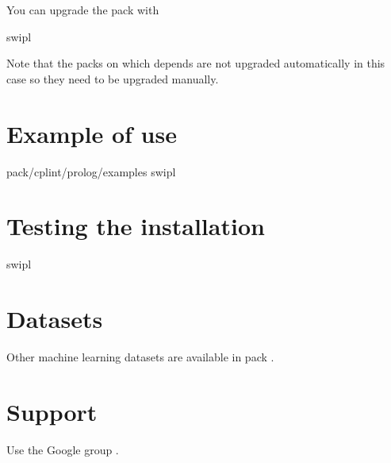 \documentclass[letterpaper,10pt,english]{sphinxmanual}
\begin{document}
\sphinxAtStartPar
You can upgrade the pack with

\begin{sphinxVerbatim}[commandchars=\\\{\}]
swipl
\end{sphinxVerbatim}

\sphinxAtStartPar
Note that the packs on which  depends are not upgraded automatically in this case so they need to be upgraded manually.


\section{Example of use}
\label{\detokenize{index:example-of-use}}
\begin{sphinxVerbatim}[commandchars=\\\{\}]
\PYGZlt{}pack\PYGZgt{}/cplint/prolog/examples
swipl
\end{sphinxVerbatim}


\section{Testing the installation}
\label{\detokenize{index:testing-the-installation}}
\begin{sphinxVerbatim}[commandchars=\\\{\}]
swipl
\end{sphinxVerbatim}


\section{Datasets}
\label{\detokenize{index:datasets}}
\sphinxAtStartPar
Other machine learning datasets are available in pack .


\section{Support}
\label{\detokenize{index:support}}
\sphinxAtStartPar
Use the Google group .
\end{document}
